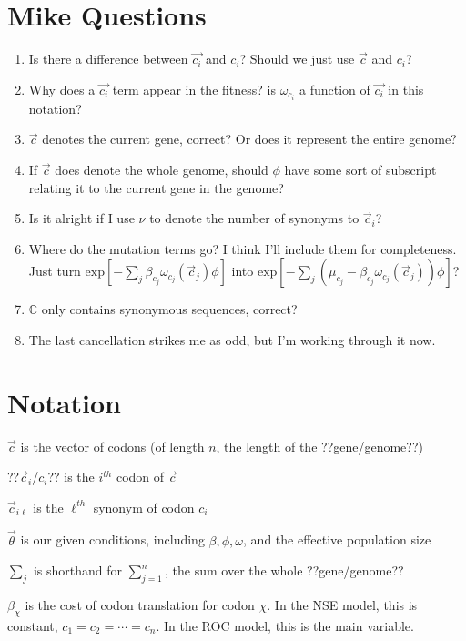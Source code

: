 \documentclass[11pt]{article} %
\begin{document}
\section{Mike Questions}
\begin{enumerate}
\item Is there a difference between $\vec{c_i}$ and $c_i$? Should we just use $\vec{c}$ and $c_i$?
\item Why does a $\vec{c_i}$ term appear in the fitness? is $\omega_{c_i}$ a function of $\vec{c_i}$ in this notation?
\item $\vec{c}$ denotes the current gene, correct? Or does it represent the entire genome?
\item If $\vec{c}$ does denote the whole genome, should $\phi$ have some sort of subscript relating it to the current gene in the genome?
\item Is it alright if I use $\nu$ to denote the number of synonyms to $\vec{c}_i$?
\item Where do the mutation terms go? I think I'll include them for completeness. Just turn
$\mbox{exp}\left[-\sum_{j} \beta_{c_j} \omega_{c_j} (\vec{c}_j) \phi \right]$
into
$\mbox{exp}\left[-\sum_{j} (\mu_{c_j} - \beta_{c_j} \omega_{c_j} (\vec{c}_j)) \phi \right]$?
\item $\mathbb{C}$ only contains synonymous sequences, correct?
\item The last cancellation strikes me as odd, but I'm working through it now.
\end{enumerate}


\section{Notation}

$\vec{c}$ is the vector of codons (of length $n$, the length of the ??gene/genome??)

??$\vec{c}_i$/$c_i$?? is the $i^{th}$ codon of $\vec{c}$

$\vec{c}_{i\ell}$ is the $\ell^{th}$ synonym of codon $c_i$

$\vec{\theta}$ is our given conditions, including $\beta, \phi, \omega$, and the effective population size

$\sum_j$ is shorthand for $\sum_{j=1}^n$, the sum over the whole ??gene/genome??

$\beta_\chi$ is the cost of codon translation for codon $\chi$. In the NSE model, this is constant, $c_1 = c_2 = \cdots = c_n$. In the ROC model, this is the main variable.
\end{document}
